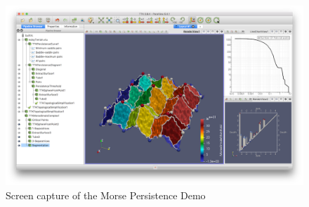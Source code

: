 \documentclass[12pt]{article}
\begin{document}
\begin{figure}[h]
\centering
\includegraphics[width=1\linewidth]{3.png}
\caption{Screen capture of the Morse Persistence Demo}
\label{fig:name}
\end{figure}
\end{document}
